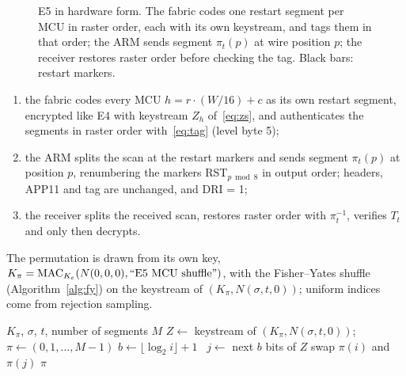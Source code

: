 \begin{figure}[t]
\centering
\resizebox{\columnwidth}{!}{}
\caption{E5 in hardware form. The fabric codes one restart segment per MCU in raster order, each with its own keystream, and tags them in that order; the ARM sends segment $\pi_t(p)$ at wire position $p$; the receiver restores raster order before checking the tag. Black bars: restart markers.}
\label{fig:e5}
\end{figure}

\begin{enumerate}
\item the fabric codes every MCU $h = r \cdot (W/16) + c$ as its own restart segment, encrypted like E4 with keystream $Z_h$ of~\eqref{eq:zs}, and authenticates the segments in raster order with~\eqref{eq:tag} (level byte 5);
\item the ARM splits the scan at the restart markers and sends segment $\pi_t(p)$ at position $p$, renumbering the markers RST$_{p \bmod 8}$ in output order; headers, APP11 and tag are unchanged, and DRI = 1;
\item the receiver splits the received scan, restores raster order with $\pi_t^{-1}$, verifies $T_t$ and only then decrypts.
\end{enumerate}
The permutation is drawn from its own key, $K_\pi = \mathrm{MAC}_{K_e}(N(0,0,0), \text{``E5 MCU shuffle''})$, with the Fisher--Yates shuffle (Algorithm~\ref{alg:fy}) on the keystream of $(K_\pi, N(\sigma, t, 0))$; uniform indices come from rejection sampling.

\begin{algorithm}[t]
\caption{E5 order $\pi_t$ (ARM core and receiver)}
\label{alg:fy}
\begin{algorithmic}[1]
\Require $K_\pi$, $\sigma$, $t$, number of segments $M$
\State $Z \gets$ keystream of $(K_\pi, N(\sigma, t, 0))$; $\pi \gets (0, 1, \ldots, M-1)$
  \State $b \gets \lfloor \log_2 i \rfloor + 1$ 
  \Repeat \ $j \gets$ next $b$ bits of $Z$ 
  \State swap $\pi(i)$ and $\pi(j)$
\EndFor
\State \Return $\pi$ 
\end{algorithmic}
\end{algorithm}

